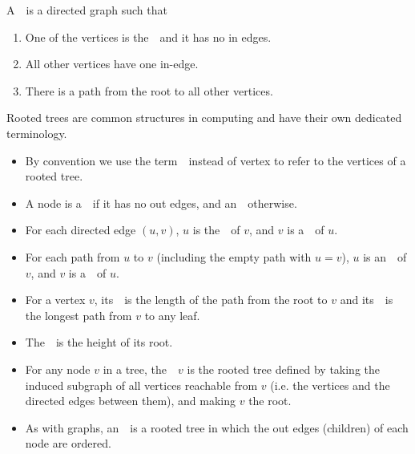 \begin{cluster}
\label{grp:def:bg::graphs::rooted-tree}

\begin{definition}
\label{def:bg::graphs::rooted-tree}

A~~is a directed graph such that
\begin{enumerate}
\item 
One of the vertices is the~~and it has no in edges.
\item 
All other vertices have one in-edge.
\item
There is a path from the root to all other vertices.
\end{enumerate}

Rooted trees are common structures in computing and have their own
dedicated terminology.
\begin{itemize}
\item
By convention we use the term~~instead of vertex to refer
to the vertices of a rooted tree.  
\item
A node is a~~if it has no out edges, and an~~otherwise.  

\item
For each directed edge $(u,v)$, $u$ is the~~of $v$, and
$v$ is a~~of $u$.  

\item
For each path from $u$ to $v$ (including the empty path with $u = v$),
$u$ is an~~of $v$, and $v$ is a~~of
$u$.
\item
For a vertex $v$, its~~is the length of the path from the
root to $v$ and its~~is the longest path from $v$ to any
leaf.  

\item
The~~is the height of its root.  

\item
For any node $v$ in a tree, the~~$v$ is the
rooted tree defined by taking the induced subgraph of all vertices
reachable from $v$ (i.e. the vertices and the directed edges between
them), and making $v$ the root.  

\item
As with graphs, an~~is a rooted tree in
which the out edges (children) of each node are ordered.
\end{itemize}

\end{definition}
\end{cluster}

